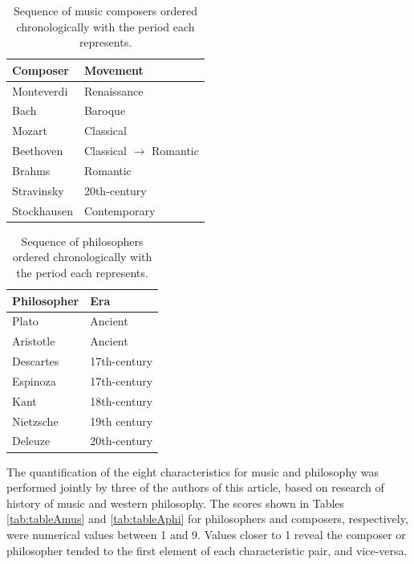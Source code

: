 \documentclass[
 aip,
 jmp,
 amsmath,amssymb,
 reprint,
]{revtex4-1}
\begin{document}
 \begin{table}[ht]
   \caption{\label{tab:table0} Sequence of music composers ordered
     chronologically with the period each represents.}
   \begin{tabular}{|l||l|}
     \hline
     Composer        & Movement \\ \hline
     Monteverdi      & Renaissance \\
     Bach            & Baroque \\
     Mozart          & Classical \\
     Beethoven       & Classical $\to$ Romantic \\
     Brahms          & Romantic \\
     Stravinsky      & 20th-century \\
     Stockhausen     & Contemporary\\
     \hline
   \end{tabular}
 \end{table}


\begin{table}[ht]
  \caption{\label{tab:table0b} Sequence of philosophers ordered
    chronologically with the period each represents.}
  \begin{tabular}{|l||l|}
    \hline
    Philosopher     & Era \\ \hline
    Plato           & Ancient \\
    Aristotle       & Ancient  \\
    Descartes       & 17th-century  \\
    Espinoza        & 17th-century  \\
    Kant            & 18th-century  \\
    Nietzsche       & 19th century  \\
    Deleuze         & 20th-century  \\
    \hline
  \end{tabular}
\end{table}

The quantification of the eight characteristics for music and
philosophy was performed jointly by three of the authors of this
article, based on research of history of music and western
philosophy. The scores shown in Tables \ref{tab:tableAmus} and
\ref{tab:tableAphi} for philosophers and composers, respectively, were
numerical values between 1 and 9. Values closer to 1 reveal the
composer or philosopher tended to the first element of each
characteristic pair, and vice-versa.
\end{document}
